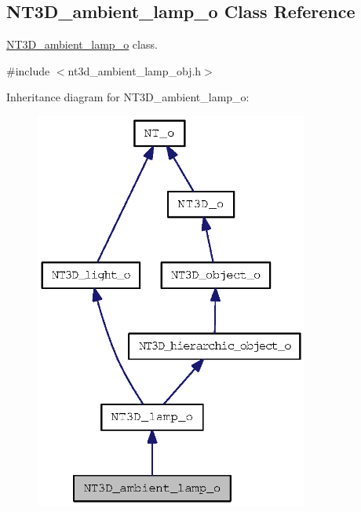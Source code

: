 \subsection{NT3D\_\-ambient\_\-lamp\_\-o Class Reference}
\label{class_n_t3_d__ambient__lamp__o}


\hyperlink{class_n_t3_d__ambient__lamp__o}{NT3D\_\-ambient\_\-lamp\_\-o} class.  




{\ttfamily \#include $<$nt3d\_\-ambient\_\-lamp\_\-obj.h$>$}



Inheritance diagram for NT3D\_\-ambient\_\-lamp\_\-o:
\nopagebreak
\begin{figure}[H]
\begin{center}
\leavevmode
\includegraphics[width=255pt]{class_n_t3_d__ambient__lamp__o__inherit__graph}
\end{center}
\end{figure}


